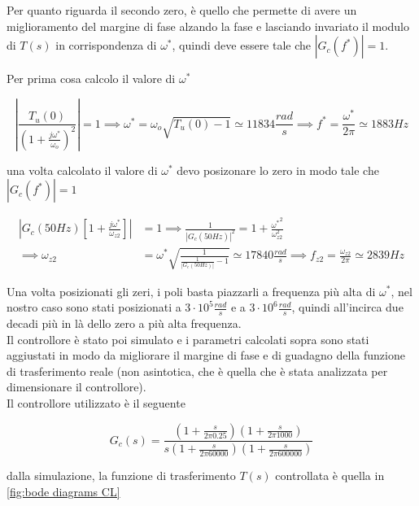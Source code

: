 \documentclass{article}
\begin{document}
\noindent
Per quanto riguarda il secondo zero, è quello che permette di avere un miglioramento del margine di fase alzando la fase e lasciando invariato il modulo di \(T(s)\) in corrispondenza di \(\omega^*\), quindi deve essere tale che \(|G_c(f^*)|=1\).

\noindent
Per prima cosa calcolo il valore di \(\omega^*\)

\vspace{0.5em}
\[
    \left| \frac{T_u(0)}{(1+\frac{j\omega^*}{\omega_o})^2} \right| = 1 \implies \omega^* = \omega_o\sqrt{T_u(0)-1} \simeq 11834 \frac{rad}{s} \implies f^* = \frac{\omega^*}{2 \pi} \simeq 1883 Hz
\]
\vspace{0.5em}

\noindent
una volta calcolato il valore di \(\omega^*\) devo posizonare lo zero in modo tale che \(|G_c(f^*)|=1\)

\vspace{0.5em}
\begin{align*}
    \left| G_c(50Hz) \left[ 1+\frac{j\omega^*}{\omega_{z2}} \right] \right| &= 1 \implies \frac{1}{\left | G_c(50Hz)\right | ^2} = 1 + \frac{{\omega^{*}}^{2}}{\omega_{z2}^2} \\ 
    \implies {\omega_{z2}} &= \omega^*\sqrt{\frac{1}{\frac{1}{\left| G_c(50Hz) \right|} - 1}} \simeq 17840 \frac{rad}{s} \implies f_{z2} = \frac{\omega_{z2}}{2 \pi} \simeq 2839Hz
\end{align*}
\vspace{0.5em}

\noindent
Una volta posizionati gli zeri, i poli basta piazzarli a frequenza più alta di \(\omega^*\), nel nostro caso sono stati posizionati a \(3\cdot10^5 \frac{rad}{s}\) e a \(3\cdot10^6 \frac{rad}{s}\), quindi all'incirca due decadi più in là dello zero a più alta frequenza. \\
Il controllore è stato poi simulato e i parametri calcolati sopra sono stati aggiustati in modo da migliorare il margine di fase e di guadagno della funzione di trasferimento reale (non asintotica, che è quella che è stata analizzata per dimensionare il controllore).\\
Il controllore utilizzato è il seguente

\vspace{0.5em}
\[
    G_c(s) = \frac{(1+\frac{s}{2 \pi 0.25})(1+\frac{s}{2 \pi 1000})}{s(1+\frac{s}{2 \pi 60000})(1+\frac{s}{2 \pi 600000})}
\]
\vspace{0.5em}

dalla simulazione, la funzione di trasferimento \(T(s)\) controllata è quella in \autoref{fig:bode diagrams CL} 
\end{document}
